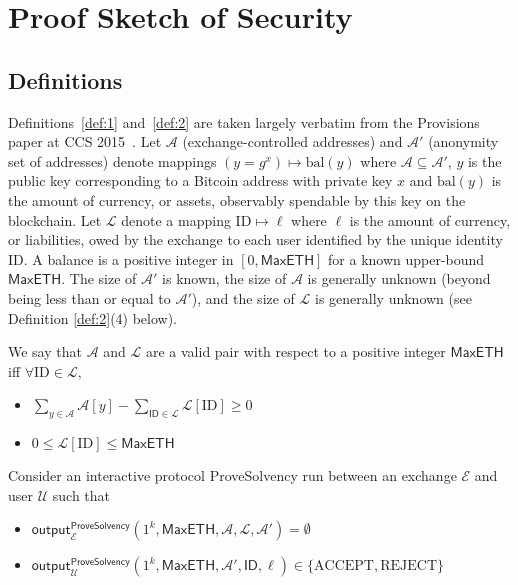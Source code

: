 
\section{Proof Sketch of Security}
\label{app:proof}

\subsection{Definitions}
\label{app:defs}

Definitions~\ref{def:1} and~\ref{def:2} are taken largely verbatim from the Provisions paper at CCS 2015~\cite{provisions}. Let $\mathcal{A}$ (exchange-controlled addresses) and $\mathcal{A}'$ (anonymity set of addresses) denote mappings $(y = g^x) \mapsto \text{bal}(y)$ where $\mathcal{A} \subseteq \mathcal{A}'$, $y$ is the public key corresponding to a Bitcoin address with private key $x$ and $\text{bal}(y)$ is the amount of currency, or assets, observably spendable by this key on the blockchain. Let $\mathcal{L}$ denote a mapping $\text{ID} \mapsto \ell$ where $\ell$ is the amount of currency, or liabilities, owed by the exchange to each user identified by the unique identity ID. A balance is a positive integer in $[0,\mathsf{MaxETH}]$ for a known upper-bound $\mathsf{MaxETH}$. The size of $\mathcal{A}'$ is known, the size of $\mathcal{A}$ is generally unknown (beyond being less than or equal to $\mathcal{A}'$), and the size of $\mathcal{L}$ is generally unknown (see Definition \ref{def:2}(4) below). 

\begin{definition}
\label{def:1}

We say that $\mathcal{A}$ and $\mathcal{L}$ are a valid pair with respect to a positive integer $\mathsf{MaxETH}$ iff $\forall \text{ID} \in \mathcal{L}$,

\begin{itemize}
\item $\sum_{y \in \mathcal{A}} \mathcal{A}[y] - \sum_{\mathsf{ID} \in \mathcal{L}} \mathcal{L}[\text{ID}] \geq 0 \quad$
\item $0 \leq \mathcal{L}[\text{ID}] \leq \mathsf{MaxETH}$
\end{itemize}


Consider an interactive protocol ProveSolvency run between an exchange $\mathcal{E}$ and user $\mathcal{U}$ such that

\begin{itemize}
\item $\mathsf{output}_{\mathcal{E}}^{\mathsf{ProveSolvency}}(1^k, \mathsf{MaxETH}, \mathcal{A}, \mathcal{L}, \mathcal{A}') = \emptyset$
\item $\mathsf{output}_{\mathcal{U}}^{\mathsf{ProveSolvency}}(1^k, \mathsf{MaxETH}, \mathcal{A}', \mathsf{ID}, \ell) \in \{\text{ACCEPT}, \text{REJECT}\}$
\end{itemize}
   
\end{definition}

